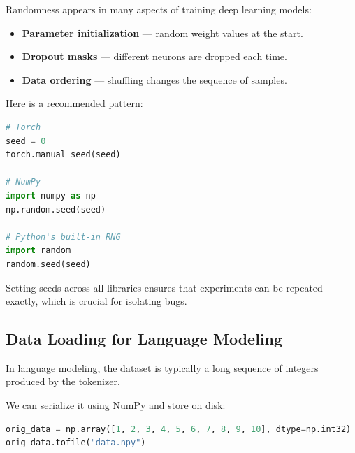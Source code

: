 Randomness appears in many aspects of training deep learning models:
\begin{itemize}
    \item \textbf{Parameter initialization} — random weight values at the start.
    \item \textbf{Dropout masks} — different neurons are dropped each time.
    \item \textbf{Data ordering} — shuffling changes the sequence of samples.
\end{itemize}

Here is a recommended pattern:

\begin{lstlisting}[language=Python]
# Torch
seed = 0
torch.manual_seed(seed)

# NumPy
import numpy as np
np.random.seed(seed)

# Python's built-in RNG
import random
random.seed(seed)
\end{lstlisting}

\noindent
Setting seeds across all libraries ensures that experiments can be repeated exactly, which is crucial for isolating bugs.

\subsection{Data Loading for Language Modeling}
In language modeling, the dataset is typically a long sequence of integers produced by the tokenizer.  

We can serialize it using NumPy and store on disk:
\begin{lstlisting}[language=Python]
orig_data = np.array([1, 2, 3, 4, 5, 6, 7, 8, 9, 10], dtype=np.int32)
orig_data.tofile("data.npy")
\end{lstlisting}


